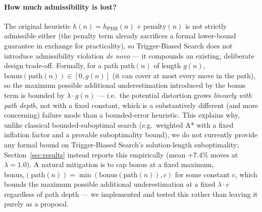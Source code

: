 \documentclass[10pt,conference]{article}
\begin{document}
\paragraph{How much admissibility is lost?} The original heuristic
$h(n) = h_{\mathrm{PDB}}(n) + \mathrm{penalty}(n)$ is not strictly
admissible either (the penalty term already sacrifices a formal
lower-bound guarantee in exchange for practicality), so
Trigger-Biased Search does not introduce admissibility violation
\emph{de novo} --- it compounds an existing, deliberate design
trade-off. Formally, for a path $\mathrm{path}(n)$ of length $g(n)$,
$\mathrm{bonus}(\mathrm{path}(n)) \in [0, g(n)]$ (it can cover at
most every move in the path), so the maximum possible additional
underestimation introduced by the bonus term is bounded by
$\lambda \cdot g(n)$ --- i.e.\ the potential distortion grows
\emph{linearly with path depth}, not with a fixed constant, which is
a substantively different (and more concerning) failure mode than a
bounded-error heuristic. This explains why, unlike classical
bounded-suboptimal search (e.g.\ weighted A* with a fixed inflation
factor and a provable suboptimality bound), we do not currently
provide any formal bound on Trigger-Biased Search's solution-length
suboptimality; Section~\ref{sec:results} instead reports this
empirically (mean $+7.4\%$ moves at $\lambda=1.0$). A natural mitigation is to cap $\mathrm{bonus}$ at a fixed maximum,
$\mathrm{bonus}_c(\mathrm{path}(n)) = \min(\mathrm{bonus}(\mathrm{path}(n)),
c)$ for some constant $c$, which bounds the maximum possible
additional underestimation at a fixed $\lambda \cdot c$ regardless of
path depth --- we implemented and tested this rather than leaving it
purely as a proposal.
\end{document}
